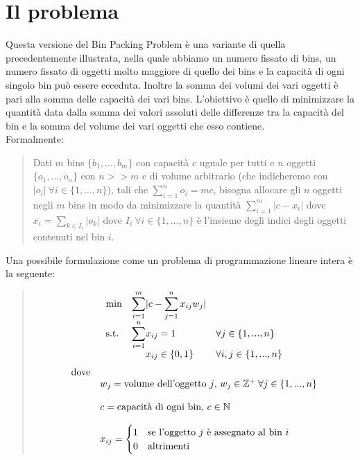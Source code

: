 \section{Il problema}
Questa versione del Bin Packing Problem è una variante di quella precedentemente illustrata, nella quale abbiamo un numero
fissato di bins, un numero fissato di oggetti molto maggiore di quello dei bins e la capacità di ogni singolo bin può essere ecceduta.
Inoltre la somma dei volumi dei vari oggetti è pari alla somma delle capacità dei vari bins.
L'obiettivo è quello di minimizzare la quantità data dalla somma dei valori assoluti delle differenze tra la capacità del bin e la somma del
volume dei vari oggetti che esso contiene. \\
Formalmente:
\begin{quote}
	Dati $ m $ bins $ \{b_1, ..., b_m\} $ con capacità $ c $ uguale per tutti e $ n $ oggetti $ \{o_1, ..., o_n\} $ con $ n >> m $ e di volume
	arbitrario (che indicheremo con $ |o_i| \: \forall i \in \{1, ..., n\} $), tali che $ \displaystyle\sum\limits_{i=1}^{n} o_i = mc $,
	bisogna allocare gli $ n $ oggetti negli $ m $ bins in modo da minimizzare la quantità $ \displaystyle\sum\limits_{i=1}^{m} |c - x_i| $
	dove $ x_i = \displaystyle\sum\limits_{k \in I_i} |o_k| $ dove $ I_i \: \forall i \in \{1, ..., n\} $ è l'insieme degli indici degli oggetti
	contenuti nel bin $ i $.
\end{quote}
Una possibile formulazione come un problema di programmazione lineare intera è la seguente:
\begin{quote}	
	\begin{equation*}
		\begin{array}{ll@{}ll}
			\text{min}  & \displaystyle\sum\limits_{i=1}^{m} & |c - \displaystyle\sum\limits_{j=1}^{n} x_{ij}w_j|   & \\
			\text{s.t.} & \displaystyle\sum\limits_{i=1}^{n} & x_{ij} = 1 			  								& \forall j \in \{1, ..., n\} \\ 
		                & 								     														& x_{ij} \in \{0,1\}  	  & \forall i, j \in \{1, ..., n\} \\
		\end{array}
	\end{equation*}
	\begin{equation*}
		\begin{array}{ll@{}ll}
	    	\text{dove} &																									   & \\
	    				& w_j = \text{volume dell'oggetto } j	\text{, } w_j \in \mathbb{Z}^+ \: \forall j \in \{1, ..., n\}  & \\ \\ 
		    			& c = \text{capacità di ogni bin, } c \in \mathbb{N} 												   & \\ \\
						& x_{ij} = 
							\begin{cases}
    							1 & \text{se l'oggetto } j \text{ è assegnato al bin } i \\
    							0 & \text{altrimenti}
							\end{cases}					    & \\
		\end{array}
	\end{equation*}
\end{quote}